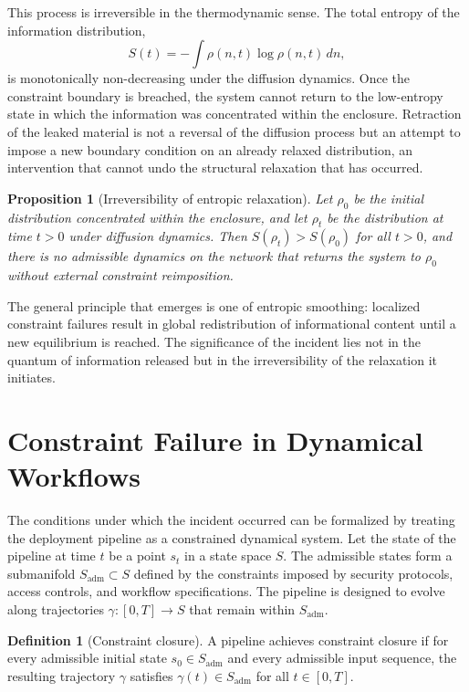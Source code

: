 \documentclass[12pt, oneside]{article}
\theoremstyle{plain}
\newtheorem{proposition}[theorem]{Proposition}
\theoremstyle{definition}
\newtheorem{definition}[theorem]{Definition}
\theoremstyle{remark}
\newcommand{\traj}{\gamma}
\begin{document}
This process is irreversible in the thermodynamic sense. The total entropy of the
information distribution,
\[
  S(t) = -\int \rho(n,t) \log \rho(n,t) \, dn,
\]
is monotonically non-decreasing under the diffusion dynamics. Once the constraint boundary
is breached, the system cannot return to the low-entropy state in which the information was
concentrated within the enclosure. Retraction of the leaked material is not a reversal of
the diffusion process but an attempt to impose a new boundary condition on an already
relaxed distribution, an intervention that cannot undo the structural relaxation that has
occurred.

\begin{proposition}[Irreversibility of entropic relaxation]
Let $\rho_0$ be the initial distribution concentrated within the enclosure, and let $\rho_t$
be the distribution at time $t > 0$ under diffusion dynamics. Then $S(\rho_t) > S(\rho_0)$
for all $t > 0$, and there is no admissible dynamics on the network that returns the system
to $\rho_0$ without external constraint reimposition.
\end{proposition}

The general principle that emerges is one of entropic smoothing: localized constraint
failures result in global redistribution of informational content until a new equilibrium
is reached. The significance of the incident lies not in the quantum of information released
but in the irreversibility of the relaxation it initiates.

\section{Constraint Failure in Dynamical Workflows}

The conditions under which the incident occurred can be formalized by treating the
deployment pipeline as a constrained dynamical system. Let the state of the pipeline at
time $t$ be a point $s_t$ in a state space $S$. The admissible states form a submanifold
$S_{\text{adm}} \subset S$ defined by the constraints imposed by security protocols, access
controls, and workflow specifications. The pipeline is designed to evolve along trajectories
$\traj : [0, T] \to S$ that remain within $S_{\text{adm}}$.

\begin{definition}[Constraint closure]
A pipeline achieves constraint closure if for every admissible initial state $s_0 \in S_{\text{adm}}$
and every admissible input sequence, the resulting trajectory $\traj$ satisfies
$\traj(t) \in S_{\text{adm}}$ for all $t \in [0, T]$.
\end{definition}
\end{document}
